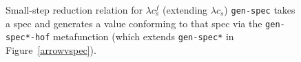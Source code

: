 \begin{figure}
  \caption{Small-step reduction relation for $\lambda c_{s}^{f}$ (extending $\lambda c_s$)
  \texttt{gen-spec} takes a spec and generates a value conforming to that spec
  via the \texttt{gen-spec*-hof} metafunction (which extends \texttt{gen-spec*} in Figure~\ref{arrowvspec}).
  }
  \label{arrowvspec-hof}
\end{figure}
